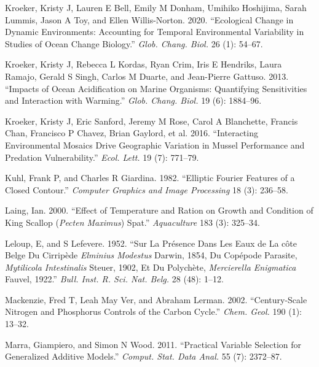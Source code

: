 \documentclass[smallextended]{svjour3}       %
\newlength{\cslhangindent}
\newenvironment{CSLReferences}[2] %
 {%
  \setlength{\parindent}{0pt}
  \ifodd #1 \everypar{\setlength{\hangindent}{\cslhangindent}}\ignorespaces\fi
  \ifnum #2 > 0
  \setlength{\parskip}{#2\baselineskip}
  \fi
 }%
 {}
\begin{document}
\begin{CSLReferences}{1}{0}
\leavevmode{}%
Kroeker, Kristy J, Lauren E Bell, Emily M Donham, Umihiko Hoshijima,
Sarah Lummis, Jason A Toy, and Ellen Willis-Norton. 2020. {``Ecological
Change in Dynamic Environments: Accounting for Temporal Environmental
Variability in Studies of Ocean Change Biology.''} \emph{Glob. Chang.
Biol.} 26 (1): 54--67.

\leavevmode{}%
Kroeker, Kristy J, Rebecca L Kordas, Ryan Crim, Iris E Hendriks, Laura
Ramajo, Gerald S Singh, Carlos M Duarte, and Jean-Pierre Gattuso. 2013.
{``Impacts of Ocean Acidification on Marine Organisms: Quantifying
Sensitivities and Interaction with Warming.''} \emph{Glob. Chang. Biol.}
19 (6): 1884--96.

\leavevmode{}%
Kroeker, Kristy J, Eric Sanford, Jeremy M Rose, Carol A Blanchette,
Francis Chan, Francisco P Chavez, Brian Gaylord, et al. 2016.
{``Interacting Environmental Mosaics Drive Geographic Variation in
Mussel Performance and Predation Vulnerability.''} \emph{Ecol. Lett.} 19
(7): 771--79.

\leavevmode{}%
Kuhl, Frank P, and Charles R Giardina. 1982. {``Elliptic Fourier
Features of a Closed Contour.''} \emph{Computer Graphics and Image
Processing} 18 (3): 236--58.

\leavevmode{}%
Laing, Ian. 2000. {``Effect of Temperature and Ration on Growth and
Condition of King Scallop (\emph{Pecten Maximus}) Spat.''}
\emph{Aquaculture} 183 (3): 325--34.

\leavevmode{}%
Leloup, E, and S Lefevere. 1952. {``Sur La Pr{é}sence Dans Les Eaux de
La c{ô}te Belge Du Cirrip{è}de \emph{Elminius Modestus} Darwin, 1854, Du
Copépode Parasite, \emph{Mytilicola Intestinalis} Steuer, 1902, Et Du
Polych{è}te, \emph{Mercierella Enigmatica} Fauvel, 1922.''} \emph{Bull.
Inst. R. Sci. Nat. Belg.} 28 (48): 1--12.

\leavevmode{}%
Mackenzie, Fred T, Leah May Ver, and Abraham Lerman. 2002.
{``Century-Scale Nitrogen and Phosphorus Controls of the Carbon
Cycle.''} \emph{Chem. Geol.} 190 (1): 13--32.

\leavevmode{}%
Marra, Giampiero, and Simon N Wood. 2011. {``Practical Variable
Selection for Generalized Additive Models.''} \emph{Comput. Stat. Data
Anal.} 55 (7): 2372--87.


\end{CSLReferences}
\end{document}

